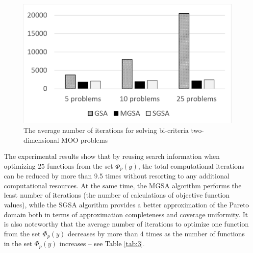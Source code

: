 \documentclass[runningheads]{llncs}
\begin{document}
\begin{figure}
  \centering
  \includegraphics[width=0.7\linewidth]{fig_t2}
  \caption{The average number of iterations for solving bi-criteria two-dimensional MOO problems}
  \label{fig:1}
\end{figure}

The experimental results show that by reusing search information when optimizing 25 functions from the set $\Phi_p (y)$, the total computational iterations can be reduced  by more than 9.5 times without resorting to any additional computational resources. At the same time, the MGSA algorithm performs the least number of iterations (the number of calculations of objective function values), while the SGSA algorithm provides a better approximation of the Pareto domain both in terms of approximation completeness and coverage uniformity. It is also noteworthy that the average number of iterations to optimize one function from the set $\Phi_p (y)$ decreases by more than 4 times as the number of functions in the set $\Phi_p (y)$ increases -- see Table \ref{tab:3}. 
\end{document}
